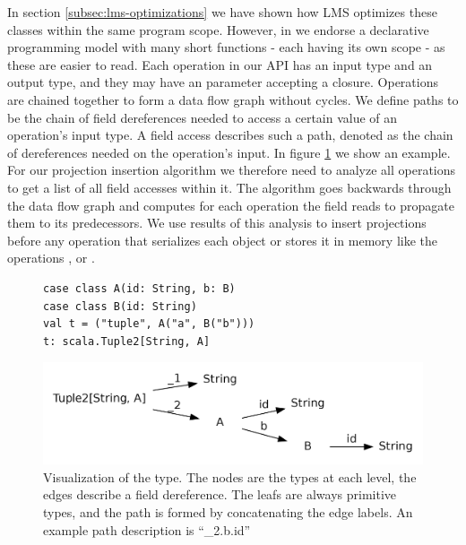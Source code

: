 In section \ref{subsec:lms-optimizations} we have shown how LMS optimizes these classes within the same program scope. However, in \tool we endorse a declarative programming model with many short functions - each having its own scope - as these are easier to read. Each operation in our API has an input type and an output type, and they may have an parameter accepting a closure. 
Operations are chained together to form a data flow graph without cycles. We define paths to be the chain of field dereferences needed to access a certain value of an operation's input type. A field access describes such a path, denoted as the chain of dereferences needed on the operation's input. In  figure \ref{fig:type_tree} we show an example. \\
For our projection insertion algorithm we therefore need to analyze all operations to get a list of all field accesses within it. The algorithm goes backwards through the data flow graph and computes for each operation the field reads to propagate them to its predecessors. We use results of this analysis to insert projections before any operation that serializes each object or stores it in memory like the operations ,  or .
\begin{figure}
\begin{lstlisting}[name=code, caption=Types for field access example, captionpos=b, label=lst:types]
case class A(id: String, b: B)
case class B(id: String)  
val t = ("tuple", A("a", B("b"))) 
t: scala.Tuple2[String, A]
\end{lstlisting}
\centering
\includegraphics[clip=true, width=0.95\columnwidth]{dot/access.png}
\caption{Visualization of the type. The nodes are the types at each level, the edges describe a field dereference. The leafs are always primitive types, and the path is formed by concatenating the edge labels. An example path description is ``\_2.b.id''}
\label{fig:type_tree}
\end{figure}
\\

